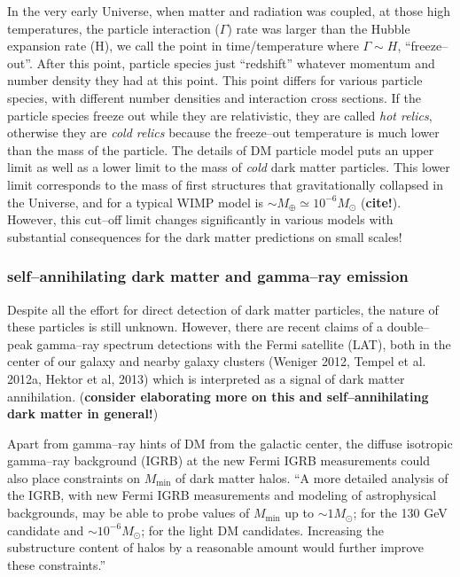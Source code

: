 \documentclass[paper=a4, fontsize=11pt]{scrartcl} %
\numberwithin{equation}{section} %
\numberwithin{figure}{section} %
\numberwithin{table}{section} %
\begin{document}
In the very early Universe, when matter and radiation was coupled, at those high temperatures, the particle interaction ($\Gamma$) rate was larger than the Hubble expansion rate (H), we call the point in time/temperature where $\Gamma \sim H$, ``freeze--out''. After this point, particle species just ``redshift'' whatever momentum and number density they had at this point. This point differs for various particle species, with different number densities and interaction cross sections. If the particle species freeze out while they are relativistic, they are called \emph{hot relics}, otherwise they are \emph{cold relics} because the freeze--out temperature is much lower than the mass of the particle. The details of DM particle model puts an upper limit as well as a lower limit to the mass of \emph{cold} dark matter particles. This lower limit corresponds to the mass of first structures that gravitationally collapsed in the Universe, and for a typical WIMP model is $\sim M_\oplus \simeq 10^{-6} M_\odot$ ({\bf cite!}). However, this cut--off limit changes significantly in various models with substantial consequences for the dark matter predictions on small scales! 

\subsubsection*{self--annihilating dark matter and gamma--ray emission}
Despite all the effort for direct detection of dark matter particles, the nature of these particles is still unknown. However, there are recent claims of a double--peak gamma--ray spectrum detections with the Fermi satellite (LAT), both in the center of our galaxy and nearby galaxy clusters (Weniger 2012, Tempel et al. 2012a, Hektor et al, 2013) which is interpreted as a signal of dark matter annihilation. ({\bf consider elaborating more on this and self--annihilating dark matter in general!})

Apart from gamma--ray hints of DM from the galactic center, the diffuse isotropic gamma--ray background (IGRB) at the new Fermi IGRB measurements could also place constraints on $M_\mathrm{min}$ of dark matter halos. ``A more detailed analysis of the IGRB, with new Fermi IGRB measurements and modeling of astrophysical backgrounds, may be able to probe values of $M_\mathrm{min}$ up to $\sim 1 M_\odot$; for the 130 GeV candidate and $\sim 10^{-6} M_\odot$; for the light DM candidates. Increasing the substructure content of halos by a reasonable amount would further improve these constraints.'' %
\end{document}
